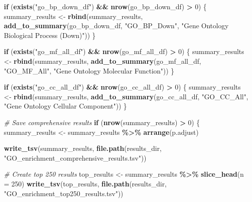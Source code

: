 \documentclass[
]{article}
\newenvironment{Shaded}{\begin{snugshade}}{\end{snugshade}}
\newcommand{\AttributeTok}[1]{\textcolor[rgb]{0.13,0.29,0.53}{#1}}
\newcommand{\CommentTok}[1]{\textcolor[rgb]{0.56,0.35,0.01}{\textit{#1}}}
\newcommand{\ControlFlowTok}[1]{\textcolor[rgb]{0.13,0.29,0.53}{\textbf{#1}}}
\newcommand{\DecValTok}[1]{\textcolor[rgb]{0.00,0.00,0.81}{#1}}
\newcommand{\FunctionTok}[1]{\textcolor[rgb]{0.13,0.29,0.53}{\textbf{#1}}}
\newcommand{\NormalTok}[1]{#1}
\newcommand{\OtherTok}[1]{\textcolor[rgb]{0.56,0.35,0.01}{#1}}
\newcommand{\SpecialCharTok}[1]{\textcolor[rgb]{0.81,0.36,0.00}{\textbf{#1}}}
\newcommand{\StringTok}[1]{\textcolor[rgb]{0.31,0.60,0.02}{#1}}
\begin{document}
\begin{Shaded}
\begin{Highlighting}[]
\ControlFlowTok{if}\NormalTok{ (}\FunctionTok{exists}\NormalTok{(}\StringTok{"go\_bp\_down\_df"}\NormalTok{) }\SpecialCharTok{\&\&} \FunctionTok{nrow}\NormalTok{(go\_bp\_down\_df) }\SpecialCharTok{\textgreater{}} \DecValTok{0}\NormalTok{) \{}
\NormalTok{  summary\_results }\OtherTok{\textless{}{-}} \FunctionTok{rbind}\NormalTok{(summary\_results,}
                          \FunctionTok{add\_to\_summary}\NormalTok{(go\_bp\_down\_df, }\StringTok{"GO\_BP\_Down"}\NormalTok{, }\StringTok{"Gene Ontology Biological Process (Down)"}\NormalTok{))}
\NormalTok{\}}

\ControlFlowTok{if}\NormalTok{ (}\FunctionTok{exists}\NormalTok{(}\StringTok{"go\_mf\_all\_df"}\NormalTok{) }\SpecialCharTok{\&\&} \FunctionTok{nrow}\NormalTok{(go\_mf\_all\_df) }\SpecialCharTok{\textgreater{}} \DecValTok{0}\NormalTok{) \{}
\NormalTok{  summary\_results }\OtherTok{\textless{}{-}} \FunctionTok{rbind}\NormalTok{(summary\_results,}
                          \FunctionTok{add\_to\_summary}\NormalTok{(go\_mf\_all\_df, }\StringTok{"GO\_MF\_All"}\NormalTok{, }\StringTok{"Gene Ontology Molecular Function"}\NormalTok{))}
\NormalTok{\}}

\ControlFlowTok{if}\NormalTok{ (}\FunctionTok{exists}\NormalTok{(}\StringTok{"go\_cc\_all\_df"}\NormalTok{) }\SpecialCharTok{\&\&} \FunctionTok{nrow}\NormalTok{(go\_cc\_all\_df) }\SpecialCharTok{\textgreater{}} \DecValTok{0}\NormalTok{) \{}
\NormalTok{  summary\_results }\OtherTok{\textless{}{-}} \FunctionTok{rbind}\NormalTok{(summary\_results,}
                          \FunctionTok{add\_to\_summary}\NormalTok{(go\_cc\_all\_df, }\StringTok{"GO\_CC\_All"}\NormalTok{, }\StringTok{"Gene Ontology Cellular Component"}\NormalTok{))}
\NormalTok{\}}

\CommentTok{\# Save comprehensive results}
\ControlFlowTok{if}\NormalTok{ (}\FunctionTok{nrow}\NormalTok{(summary\_results) }\SpecialCharTok{\textgreater{}} \DecValTok{0}\NormalTok{) \{}
\NormalTok{  summary\_results }\OtherTok{\textless{}{-}}\NormalTok{ summary\_results }\SpecialCharTok{\%\textgreater{}\%}
    \FunctionTok{arrange}\NormalTok{(p.adjust)}
  
  \FunctionTok{write\_tsv}\NormalTok{(summary\_results, }\FunctionTok{file.path}\NormalTok{(results\_dir, }\StringTok{"GO\_enrichment\_comprehensive\_results.tsv"}\NormalTok{))}
  
  \CommentTok{\# Create top 250 results}
\NormalTok{  top\_results }\OtherTok{\textless{}{-}}\NormalTok{ summary\_results }\SpecialCharTok{\%\textgreater{}\%}
    \FunctionTok{slice\_head}\NormalTok{(}\AttributeTok{n =} \DecValTok{250}\NormalTok{)}
  \FunctionTok{write\_tsv}\NormalTok{(top\_results, }\FunctionTok{file.path}\NormalTok{(results\_dir, }\StringTok{"GO\_enrichment\_top250\_results.tsv"}\NormalTok{))}
  

\end{Highlighting}
\end{Shaded}
\end{document}
